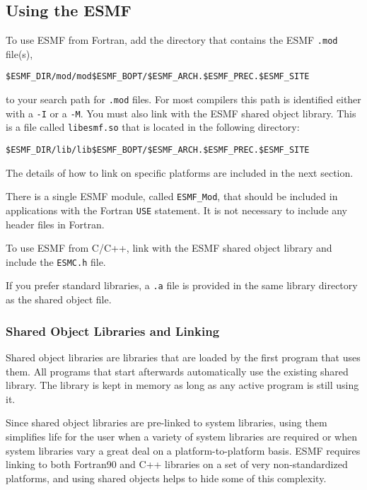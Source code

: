 
\subsection{Using the ESMF}
\label{UsingLibrary}

To use ESMF from Fortran, add the directory that contains
the ESMF {\tt *.mod} file(s),

\begin{verbatim}
$ESMF_DIR/mod/mod$ESMF_BOPT/$ESMF_ARCH.$ESMF_PREC.$ESMF_SITE
\end{verbatim} 

to your search path for {\tt *.mod} files.  For most compilers this path 
is identified either with a {\tt -I} or a {\tt -M}.  You must also link 
with the ESMF shared object library.  This is a file called 
{\tt libesmf.so} that is located in the following directory:

\begin{verbatim}
$ESMF_DIR/lib/lib$ESMF_BOPT/$ESMF_ARCH.$ESMF_PREC.$ESMF_SITE
\end{verbatim} 

The details of how to link on specific platforms are included in the 
next section.

There is a single ESMF module, called {\tt ESMF\_Mod}, that should be 
included in applications with the Fortran {\tt USE} statement.  It 
is not necessary to include any header files in Fortran.

To use ESMF from C/C++, link with the ESMF shared object library 
and include the {\tt ESMC.h} file. 

If you prefer standard libraries, a {\tt *.a} file is provided  
in the same library directory as the shared object file.  

\subsubsection{Shared Object Libraries and Linking}

Shared object libraries are libraries that are loaded by the first program 
that uses them. All programs that start afterwards automatically use the 
existing shared library. The library is kept in memory as long as any 
active program is still using it. 

Since shared object libraries are pre-linked to system libraries, using them
simplifies life for the user when a variety of system libraries are
required or when system libraries vary a great deal on a 
platform-to-platform basis.  ESMF requires linking to both Fortran90 and
C++ libraries on a set of very non-standardized platforms, and using
shared objects helps to hide some of this complexity.

